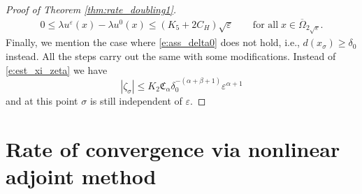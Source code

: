 \documentclass[11pt,reqno]{amsart}
\numberwithin{figure}{section}
\theoremstyle{plain}
\theoremstyle{remark}
\numberwithin{equation}{section}
\begin{document}
\begin{proof}[Proof of Theorem \ref{thm:rate_doubling1}]
\begin{align*}
    0 \leq \lambda u^\varepsilon(x) - \lambda u^0(x) \leq \left(K_5 + 2C_H\right)\sqrt{\varepsilon} \qquad\text{for all}\; x\in \overline{\Omega}_{2\sqrt{\varepsilon}}.
\end{align*}
Finally, we mention the case where \eqref{e:ass_delta0} does not hold, i.e., $d(x_\sigma)\geq \delta_0$ instead. All the steps carry out the same with some modifications. Instead of \eqref{e:est_xi_zeta} we have
\begin{equation*}
    |\zeta_\sigma| \leq K_2\mathfrak{C}_\alpha \delta_0^{-(\alpha+\beta+1)} \varepsilon^{\alpha+1}
\end{equation*}
and at this point $\sigma$ is still independent of $\varepsilon$. 
\end{proof}



\section{Rate of convergence via nonlinear adjoint method}



\end{document}
